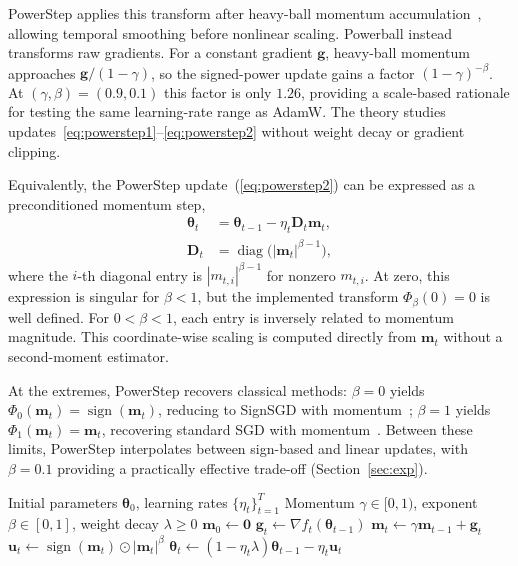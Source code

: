 \documentclass{article}
\begin{document}
PowerStep applies this transform after heavy-ball momentum accumulation~\citep{polyak1964some}, allowing temporal smoothing before nonlinear scaling. Powerball instead transforms raw gradients. For a constant gradient $\mathbf g$, heavy-ball momentum approaches $\mathbf g/(1-\gamma)$, so the signed-power update gains a factor $(1-\gamma)^{-\beta}$. At $(\gamma,\beta)=(0.9,0.1)$ this factor is only $1.26$, providing a scale-based rationale for testing the same learning-rate range as AdamW. The theory studies updates~\eqref{eq:powerstep1}--\eqref{eq:powerstep2} without weight decay or gradient clipping.

Equivalently, the PowerStep update~(\ref{eq:powerstep2}) can be expressed as a preconditioned momentum step,
\begin{align}
\bm{\theta}_t &= \bm{\theta}_{t-1} - \eta_t \mathbf{D}_t \mathbf{m}_t, \\
\mathbf{D}_t &= \operatorname{diag}\bigl(|\mathbf{m}_t|^{\beta-1}\bigr), \label{eq:up1}
\end{align}
where the $i$-th diagonal entry is $|m_{t,i}|^{\beta-1}$ for nonzero $m_{t,i}$. At zero, this expression is singular for $\beta<1$, but the implemented transform $\Phi_\beta(0)=0$ is well defined. For $0<\beta<1$, each entry is inversely related to momentum magnitude. This coordinate-wise scaling is computed directly from $\mathbf m_t$ without a second-moment estimator. 

At the extremes, PowerStep recovers classical methods: $\beta = 0$ yields $\Phi_0(\mathbf{m}_t) = \operatorname{sign}(\mathbf{m}_t)$, reducing to SignSGD with momentum~\citep{bernstein2018signsgd,balles2018dissecting}; $\beta = 1$ yields $\Phi_1(\mathbf{m}_t) = \mathbf{m}_t$, recovering standard SGD with momentum~\citep{polyak1964some}. Between these limits, PowerStep interpolates between sign-based and linear updates, with $\beta = 0.1$ providing a practically effective trade-off (Section~\ref{sec:exp}).

\begin{algorithm}[H]
\caption{PowerStep}\label{alg:psd}
\begin{algorithmic}[1]
\Require Initial parameters $\bm{\theta}_0$, learning rates $\{\eta_t\}_{t=1}^T$
\Require Momentum $\gamma\in[0,1)$, exponent $\beta\in[0,1]$, weight decay $\lambda\ge0$
\State $\mathbf{m}_0\leftarrow\mathbf{0}$
\State $\mathbf{g}_t\leftarrow\nabla f_t(\bm{\theta}_{t-1})$ 
\State $\mathbf{m}_t\leftarrow\gamma \mathbf{m}_{t-1}+\mathbf{g}_t$ 
\State $\mathbf{u}_t\leftarrow\operatorname{sign}(\mathbf{m}_t)\odot|\mathbf{m}_t|^\beta$ 
\State $\bm{\theta}_t\leftarrow(1-\eta_t\lambda)\bm{\theta}_{t-1}-\eta_t\mathbf{u}_t$
\EndFor
\end{algorithmic}
\end{algorithm}
\end{document}
